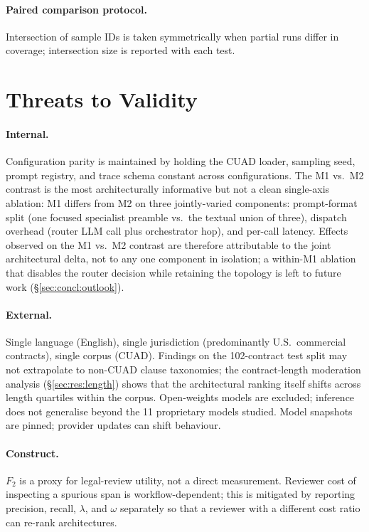 \paragraph{Paired comparison protocol.}
Intersection of sample IDs is taken symmetrically when partial runs differ in coverage;
intersection size is reported with each test.

\section{Threats to Validity}\label{sec:meth:threats}

\paragraph{Internal.} Configuration parity is maintained by holding the CUAD loader,
sampling seed, prompt registry, and trace schema constant across configurations.
The M1 vs.\ M2 contrast is the most architecturally informative but not a
clean single-axis ablation: M1 differs from M2 on three jointly-varied
components: prompt-format split (one focused specialist preamble vs.\
the textual union of three), dispatch overhead (router LLM call plus
orchestrator hop), and per-call latency. Effects observed on the M1 vs.\ M2
contrast are therefore attributable to the joint architectural delta, not
to any one component in isolation; a within-M1 ablation that disables
the router decision while retaining the topology is left to future work
(\S\ref{sec:concl:outlook}).

\paragraph{External.} Single language (English), single jurisdiction (predominantly
U.S.\ commercial contracts), single corpus (CUAD). Findings on the 102-contract
test split may not extrapolate to non-CUAD clause taxonomies; the contract-length
moderation analysis (\S\ref{sec:res:length}) shows that the architectural ranking
itself shifts across length quartiles within the corpus. Open-weights
models are excluded; inference does not generalise beyond the 11 proprietary models
studied. Model snapshots are pinned; provider updates can shift behaviour.

\paragraph{Construct.} $F_2$ is a proxy for legal-review utility, not a direct
measurement. Reviewer cost of inspecting a spurious span is workflow-dependent; this
is mitigated by reporting precision, recall, $\lambda$, and $\omega$ separately so
that a reviewer with a different cost ratio can re-rank architectures.

